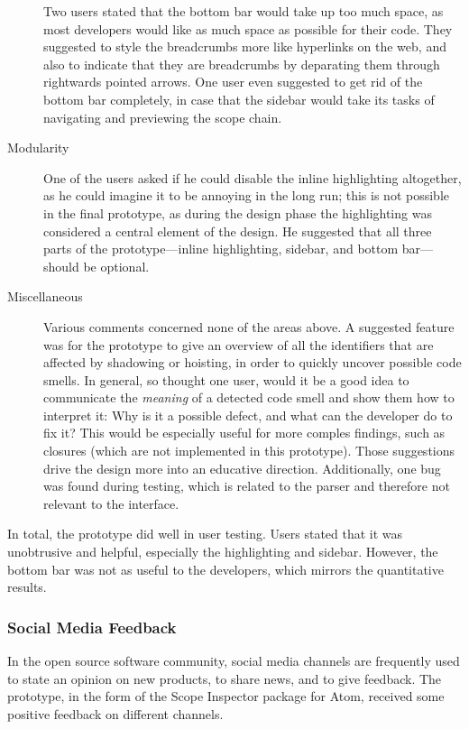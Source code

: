 \begin{description}
Two users stated that the bottom bar would take up too much space, as
most developers would like as much space as possible for their code.
They suggested to style the breadcrumbs more like hyperlinks on the web,
and also to indicate that they are breadcrumbs by deparating them
through rightwards pointed arrows. One user even suggested to get rid of
the bottom bar completely, in case that the sidebar would take its tasks
of navigating and previewing the scope chain.
\item[Modularity]
One of the users asked if he could disable the inline highlighting
altogether, as he could imagine it to be annoying in the long run; this
is not possible in the final prototype, as during the design phase the
highlighting was considered a central element of the design. He
suggested that all three parts of the prototype—inline highlighting,
sidebar, and bottom bar—should be optional.
\item[Miscellaneous]
Various comments concerned none of the areas above. A suggested feature
was for the prototype to give an overview of all the identifiers that
are affected by shadowing or hoisting, in order to quickly uncover
possible code smells. In general, so thought one user, would it be a
good idea to communicate the \emph{meaning} of a detected code smell and
show them how to interpret it: Why is it a possible defect, and what can
the developer do to fix it? This would be especially useful for more
comples findings, such as closures (which are not implemented in this
prototype). Those suggestions drive the design more into an educative
direction. Additionally, one bug was found during testing, which is
related to the parser and therefore not relevant to the interface.
\end{description}

In total, the prototype did well in user testing. Users stated that it
was unobtrusive and helpful, especially the highlighting and sidebar.
However, the bottom bar was not as useful to the developers, which
mirrors the quantitative results.

\subsubsection{Social Media Feedback}\label{social-media-feedback}

In the open source software community, social media channels are
frequently used to state an opinion on new products, to share news, and
to give feedback. The prototype, in the form of the Scope Inspector
package for Atom, received some positive feedback on different channels.

